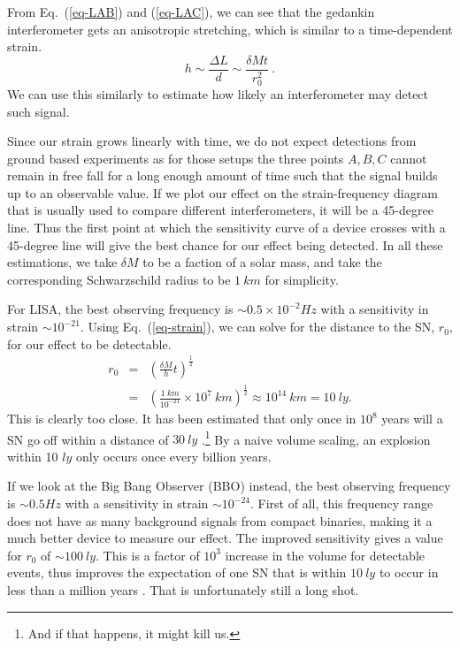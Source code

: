 \documentclass[aps,showpacs,onecolumn,floats,prd,superscriptaddress,nofootinbib]{revtex4-1}
\begin{document}
From Eq.~(\ref{eq-LAB}) and (\ref{eq-LAC}), we can see that the gedankin interferometer gets an anisotropic stretching, which is similar to a time-dependent strain.
\begin{equation}
h \sim \frac{\Delta L}{d} \sim \frac{\delta M t}{r_0^2}~.
\label{eq-strain}
\end{equation} 
We can use this similarly to estimate how likely an interferometer may detect such signal.

Since our strain grows linearly with time, we do not expect detections from ground based experiments as for those setups the three points $A,B,C$ cannot remain in free fall for a long enough amount of time such that the signal builds up to an observable value. 
If we plot our effect on the strain-frequency diagram \cite{GWcurves} that is usually used to compare different interferometers, it will be a 45-degree line. Thus the first point at which the sensitivity curve of a device crosses with a 45-degree line will give the best chance for our effect being detected. In all these estimations, we take $\delta M$ to be a faction of a solar mass, and take the corresponding Schwarzschild radius to be $1~km$ for simplicity.

For LISA, the best observing frequency is $\sim 0.5 \times10^{-2} Hz$ with a sensitivity in strain $\sim 10^{-21}$. Using Eq.~(\ref{eq-strain}), we can solve for the distance to the SN, $r_0$, for our effect to be detectable.
\begin{eqnarray}
	r_0 & = &  \left(  \frac{\delta M}{h} t \right)^\frac{1}{2} \label{Meas}	\\
	& = &  \left( \frac{1 \ km}{10^{-21}} \times 10^7 \ km \right)^\frac{1}{2} \approx 10^{14} \ km = 10 \ ly.
\end{eqnarray}
This is clearly too close. It has been estimated that only once in $10^8$ years will a SN go off within a distance of $30 \ ly$ \cite{EllSch93}.\footnote{And if that happens, it might kill us.} By a naive volume scaling, an explosion within 10 $ly$ only occurs once every billion years.

If we look at the Big Bang Observer (BBO) instead, the best observing frequency is $\sim 0.5 Hz$ with a sensitivity in strain $\sim 10^{-24}$. First of all, this frequency range does not have as many background signals from compact binaries, making it a much better device to measure our effect. The improved sensitivity gives a value for $r_0$ of $\sim 100 \ ly$. This is a factor of $10^3$ increase in the volume for detectable events, thus improves the expectation of one SN that is within $10 \ ly$ to occur in less than a million years . That is unfortunately still a long shot.
\end{document}
